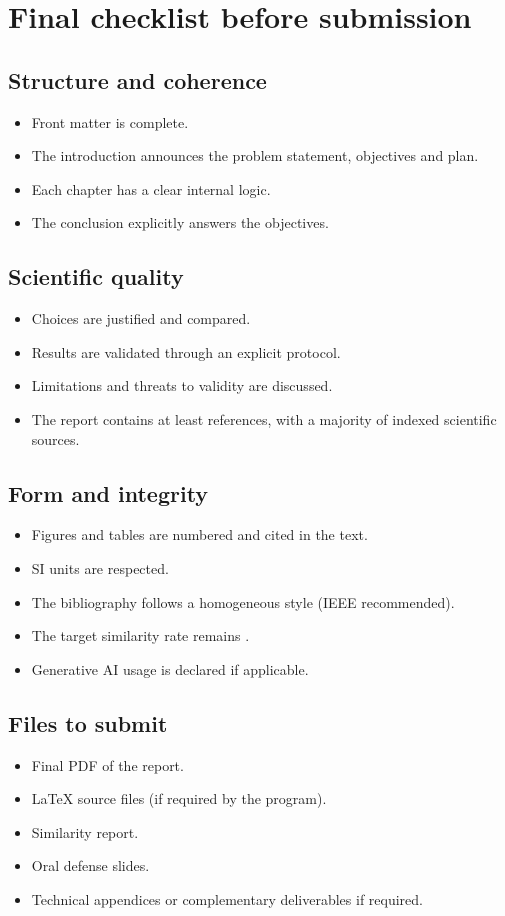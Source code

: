 \chapter{Final checklist before submission}

\section{Structure and coherence}
\begin{itemize}[leftmargin=1.2cm]
\item \okitem{} Front matter is complete.
\item \okitem{} The introduction announces the problem statement, objectives and plan.
\item \okitem{} Each chapter has a clear internal logic.
\item \okitem{} The conclusion explicitly answers the objectives.
\end{itemize}

\section{Scientific quality}
\begin{itemize}[leftmargin=1.2cm]
\item \okitem{} Choices are justified and compared.
\item \okitem{} Results are validated through an explicit protocol.
\item \okitem{} Limitations and threats to validity are discussed.
\item \okitem{} The report contains at least \MinReferences{} references, with a majority of indexed scientific sources.
\end{itemize}

\section{Form and integrity}
\begin{itemize}[leftmargin=1.2cm]
\item \okitem{} Figures and tables are numbered and cited in the text.
\item \okitem{} SI units are respected.
\item \okitem{} The bibliography follows a homogeneous style (IEEE recommended).
\item \okitem{} The target similarity rate remains \SimilarityTarget{}.
\item \okitem{} Generative AI usage is declared if applicable.
\end{itemize}

\section{Files to submit}
\begin{itemize}[leftmargin=1.2cm]
\item Final PDF of the report.
\item LaTeX source files (if required by the program).
\item Similarity report.
\item Oral defense slides.
\item Technical appendices or complementary deliverables if required.
\end{itemize}
